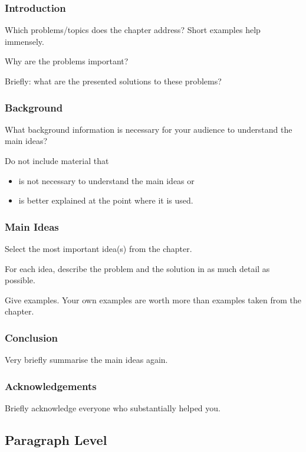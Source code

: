 \begin{frame}
  \frametitle{Introduction}

  Which problems/topics does the chapter address? Short examples help immensely.

  \medskip
  \pause

  Why are the problems important?

  \medskip
  \pause

  Briefly: what are the presented solutions to these problems?
\end{frame}

\begin{frame}
  \frametitle{Background}

  What background information is necessary for your audience to understand the main ideas?

  \medskip
  \pause

  Do not include material that
  \begin{itemize}
    \item is not necessary to understand the main ideas or
    \item is better explained at the point where it is used.
  \end{itemize}
\end{frame}

\begin{frame}
  \frametitle{Main Ideas}

  Select the most important idea(s) from the chapter.

  \medskip
  \pause

  For each idea, describe the problem and the solution in as much detail as possible.

  \medskip
  \pause

  Give examples. Your own examples are worth more than examples taken from the chapter.
\end{frame}

\begin{frame}
  \frametitle{Conclusion}

  Very briefly summarise the main ideas again.
\end{frame}

\begin{frame}
  \frametitle{Acknowledgements}

  Briefly acknowledge everyone who substantially helped you.
\end{frame}

\subsection{Paragraph Level}

